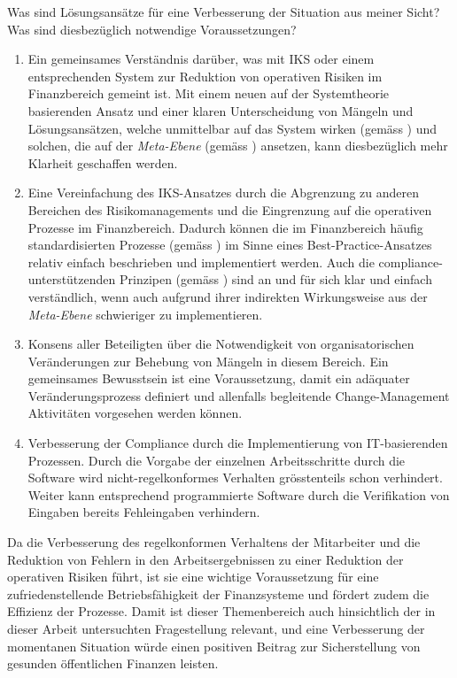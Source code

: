 \documentclass[10pt]{article}
\begin{document}
Was sind Lösungsansätze für eine Verbesserung der Situation aus meiner Sicht? Was sind diesbezüglich notwendige Voraussetzungen?

\begin{enumerate}
    \item Ein gemeinsames Verständnis darüber, was mit IKS oder einem entsprechenden System zur Reduktion von operativen Risiken im Finanzbereich gemeint ist. Mit einem neuen auf der Systemtheorie basierenden Ansatz und einer klaren Unterscheidung von Mängeln und Lösungsansätzen, welche unmittelbar auf das System wirken (gemäss ) und solchen, die auf der \textit{Meta-Ebene} (gemäss ) ansetzen, kann diesbezüglich mehr Klarheit geschaffen werden.

    \item Eine Vereinfachung des IKS-Ansatzes durch die Abgrenzung zu anderen Bereichen des Risikomanagements und die Eingrenzung auf die operativen Prozesse im Finanzbereich. Dadurch können die im Finanzbereich häufig standardisierten Prozesse (gemäss ) im Sinne eines Best-Practice-Ansatzes relativ einfach beschrieben und implementiert werden. Auch die compliance-unterstützenden Prinzipen (gemäss ) sind an und für sich klar und einfach verständlich, wenn auch aufgrund ihrer indirekten Wirkungsweise aus der \textit{Meta-Ebene} schwieriger zu implementieren.

    \item Konsens aller Beteiligten über die Notwendigkeit von organisatorischen Veränderungen zur Behebung von Mängeln in diesem Bereich. Ein gemeinsames Bewusstsein ist eine Voraussetzung, damit ein adäquater Veränderungsprozess definiert und allenfalls begleitende Change-Management Aktivitäten vorgesehen werden können.

    \item Verbesserung der Compliance durch die Implementierung von IT-basierenden Prozessen. Durch die Vorgabe der einzelnen Arbeitsschritte durch die Software wird nicht-regelkonformes Verhalten grösstenteils schon verhindert. Weiter kann entsprechend programmierte Software durch die Verifikation von Eingaben bereits Fehleingaben verhindern.

\end{enumerate}

Da die Verbesserung des regelkonformen Verhaltens der Mitarbeiter und die Reduktion von Fehlern in den Arbeitsergebnissen zu einer Reduktion der operativen Risiken führt, ist sie eine wichtige Voraussetzung für eine zufriedenstellende Betriebsfähigkeit der Finanzsysteme und fördert zudem die Effizienz der Prozesse. Damit ist dieser Themen­bereich auch hinsichtlich der in dieser Arbeit untersuchten Fragestellung relevant, und eine Verbesserung der momentanen Situation würde einen positiven Beitrag zur Sicherstellung von gesunden öffentlichen Finanzen leisten.
\end{document}
